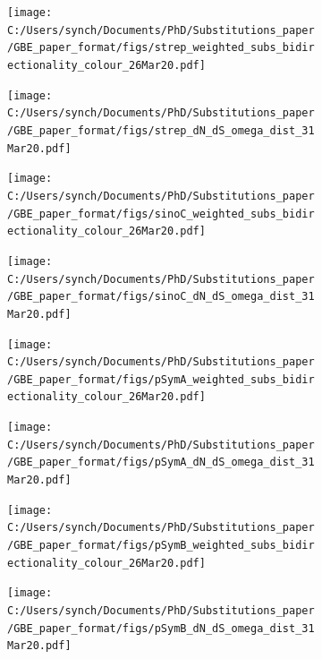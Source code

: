 \documentclass[12pt]{article}
\begin{document}
\begin{figure}
	\centering
	\begin{subfigure}{.5\textwidth}
		\centering
		\texttt{[image: C:/Users/synch/Documents/PhD/Substitutions\_paper/GBE\_paper\_format/figs/strep\_weighted\_subs\_bidirectionality\_colour\_26Mar20.pdf]}
		\caption{}
		\label{fig:s1}
	\end{subfigure}%
	\begin{subfigure}{.5\textwidth}
		\centering
		\texttt{[image: C:/Users/synch/Documents/PhD/Substitutions\_paper/GBE\_paper\_format/figs/strep\_dN\_dS\_omega\_dist\_31Mar20.pdf]}
		\caption{}
		\label{fig:s2}
	\end{subfigure}
	\label{fig:strep}
\end{figure}

\begin{figure}
	\centering
	\begin{subfigure}{.5\textwidth}
		\centering
		\texttt{[image: C:/Users/synch/Documents/PhD/Substitutions\_paper/GBE\_paper\_format/figs/sinoC\_weighted\_subs\_bidirectionality\_colour\_26Mar20.pdf]}
		\caption{}
		\label{fig:sC1}
	\end{subfigure}%
	\begin{subfigure}{.5\textwidth}
		\centering
		\texttt{[image: C:/Users/synch/Documents/PhD/Substitutions\_paper/GBE\_paper\_format/figs/sinoC\_dN\_dS\_omega\_dist\_31Mar20.pdf]}
		\caption{}
		\label{fig:sC2}
	\end{subfigure}
	\label{fig:sinoC}
\end{figure}

\begin{figure}
	\centering
	\begin{subfigure}{.5\textwidth}
		\centering
		\texttt{[image: C:/Users/synch/Documents/PhD/Substitutions\_paper/GBE\_paper\_format/figs/pSymA\_weighted\_subs\_bidirectionality\_colour\_26Mar20.pdf]}
		\caption{}
		\label{fig:sP1}
	\end{subfigure}%
	\begin{subfigure}{.5\textwidth}
		\centering
		\texttt{[image: C:/Users/synch/Documents/PhD/Substitutions\_paper/GBE\_paper\_format/figs/pSymA\_dN\_dS\_omega\_dist\_31Mar20.pdf]}
		\caption{}
		\label{fig:sP2}
	\end{subfigure}
	\label{fig:pSymA}
\end{figure}

\begin{figure}
	\centering
	\begin{subfigure}{.5\textwidth}
		\centering
		\texttt{[image: C:/Users/synch/Documents/PhD/Substitutions\_paper/GBE\_paper\_format/figs/pSymB\_weighted\_subs\_bidirectionality\_colour\_26Mar20.pdf]}
		\caption{}
		\label{fig:sB1}
	\end{subfigure}%
	\begin{subfigure}{.5\textwidth}
		\centering
		\texttt{[image: C:/Users/synch/Documents/PhD/Substitutions\_paper/GBE\_paper\_format/figs/pSymB\_dN\_dS\_omega\_dist\_31Mar20.pdf]}
		\caption{}
		\label{fig:sB2}
	\end{subfigure}
	\label{fig:pSymB}
\end{figure}
\end{document}
